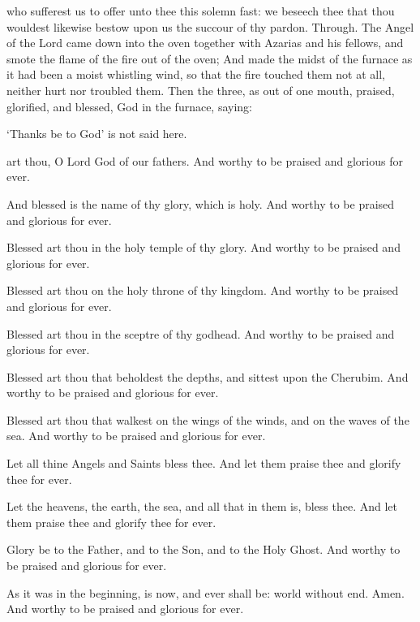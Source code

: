 \collect
{} who sufferest us to offer unto thee this solemn fast: we beseech thee that thou wouldest likewise bestow upon us the succour of thy pardon. Through.
 The Angel of the Lord came down into the oven together with Azarias and his fellows, and smote the flame of the fire out of the oven; And made the midst of the furnace as it had been a moist whistling wind, so that the fire touched them not at all, neither hurt nor troubled them. Then the three, as out of one mouth, praised, glorified, and blessed, God in the furnace, saying:
\begin{rubric}
    `Thanks be to God' is not said here.
\end{rubric}
 art thou, O Lord God of our fathers. And worthy to be praised and glorious for ever.

And blessed is the name of thy glory, which is holy. And worthy to be praised and glorious for ever.

Blessed art thou in the holy temple of thy glory. And worthy to be praised and glorious for ever.

Blessed art thou on the holy throne of thy kingdom. And worthy to be praised and glorious for ever.

Blessed art thou in the sceptre of thy godhead. And worthy to be praised and glorious for ever.

Blessed art thou that beholdest the depths, and sittest upon the Cherubim. And worthy to be praised and glorious for ever.

Blessed art thou that walkest on the wings of the winds, and on the waves of the sea. And worthy to be praised and glorious for ever.

Let all thine Angels and Saints bless thee. And let them praise thee and glorify thee for ever.

Let the heavens, the earth, the sea, and all that in them is, bless thee. And let them praise thee and glorify thee for ever.

Glory be to the Father, and to the Son, and to the Holy Ghost. And worthy to be praised and glorious for ever.

As it was in the beginning, is now, and ever shall be: world without end. Amen. And worthy to be praised and glorious for ever.

